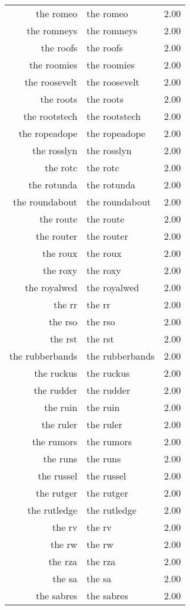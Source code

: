 \begin{table}[ht]
\begin{tabular}{rlr}
  the romeo & the romeo & 2.00 \\ 
  the romneys & the romneys & 2.00 \\ 
  the roofs & the roofs & 2.00 \\ 
  the roomies & the roomies & 2.00 \\ 
  the roosevelt & the roosevelt & 2.00 \\ 
  the roots & the roots & 2.00 \\ 
  the rootstech & the rootstech & 2.00 \\ 
  the ropeadope & the ropeadope & 2.00 \\ 
  the rosslyn & the rosslyn & 2.00 \\ 
  the rotc & the rotc & 2.00 \\ 
  the rotunda & the rotunda & 2.00 \\ 
  the roundabout & the roundabout & 2.00 \\ 
  the route & the route & 2.00 \\ 
  the router & the router & 2.00 \\ 
  the roux & the roux & 2.00 \\ 
  the roxy & the roxy & 2.00 \\ 
  the royalwed & the royalwed & 2.00 \\ 
  the rr & the rr & 2.00 \\ 
  the rso & the rso & 2.00 \\ 
  the rst & the rst & 2.00 \\ 
  the rubberbands & the rubberbands & 2.00 \\ 
  the ruckus & the ruckus & 2.00 \\ 
  the rudder & the rudder & 2.00 \\ 
  the ruin & the ruin & 2.00 \\ 
  the ruler & the ruler & 2.00 \\ 
  the rumors & the rumors & 2.00 \\ 
  the runs & the runs & 2.00 \\ 
  the russel & the russel & 2.00 \\ 
  the rutger & the rutger & 2.00 \\ 
  the rutledge & the rutledge & 2.00 \\ 
  the rv & the rv & 2.00 \\ 
  the rw & the rw & 2.00 \\ 
  the rza & the rza & 2.00 \\ 
  the sa & the sa & 2.00 \\ 
  the sabres & the sabres & 2.00 \\ 

\end{tabular}
\end{table}
